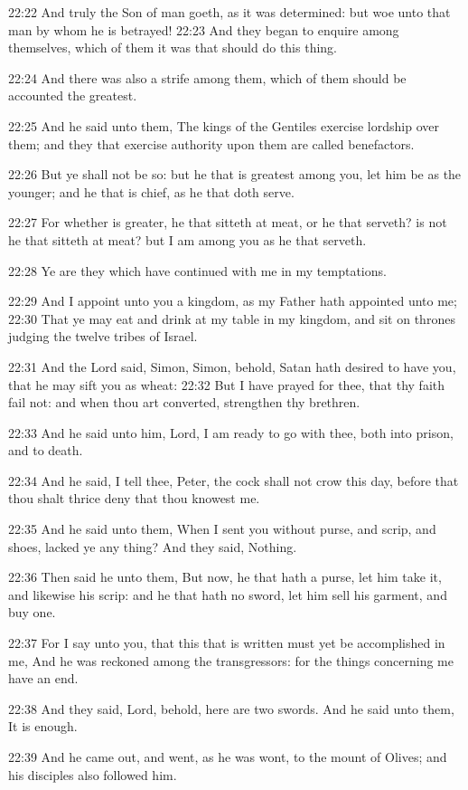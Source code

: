22:22 And truly the Son of man goeth, as it was determined: but woe unto that man by whom he is betrayed!  22:23 And they began to enquire among themselves, which of them it was that should do this thing.

22:24 And there was also a strife among them, which of them should be accounted the greatest.

22:25 And he said unto them, The kings of the Gentiles exercise lordship over them; and they that exercise authority upon them are called benefactors.

22:26 But ye shall not be so: but he that is greatest among you, let him be as the younger; and he that is chief, as he that doth serve.

22:27 For whether is greater, he that sitteth at meat, or he that serveth?  is not he that sitteth at meat? but I am among you as he that serveth.

22:28 Ye are they which have continued with me in my temptations.

22:29 And I appoint unto you a kingdom, as my Father hath appointed unto me; 22:30 That ye may eat and drink at my table in my kingdom, and sit on thrones judging the twelve tribes of Israel.

22:31 And the Lord said, Simon, Simon, behold, Satan hath desired to have you, that he may sift you as wheat: 22:32 But I have prayed for thee, that thy faith fail not: and when thou art converted, strengthen thy brethren.

22:33 And he said unto him, Lord, I am ready to go with thee, both into prison, and to death.

22:34 And he said, I tell thee, Peter, the cock shall not crow this day, before that thou shalt thrice deny that thou knowest me.

22:35 And he said unto them, When I sent you without purse, and scrip, and shoes, lacked ye any thing? And they said, Nothing.

22:36 Then said he unto them, But now, he that hath a purse, let him take it, and likewise his scrip: and he that hath no sword, let him sell his garment, and buy one.

22:37 For I say unto you, that this that is written must yet be accomplished in me, And he was reckoned among the transgressors: for the things concerning me have an end.

22:38 And they said, Lord, behold, here are two swords. And he said unto them, It is enough.

22:39 And he came out, and went, as he was wont, to the mount of Olives; and his disciples also followed him.

